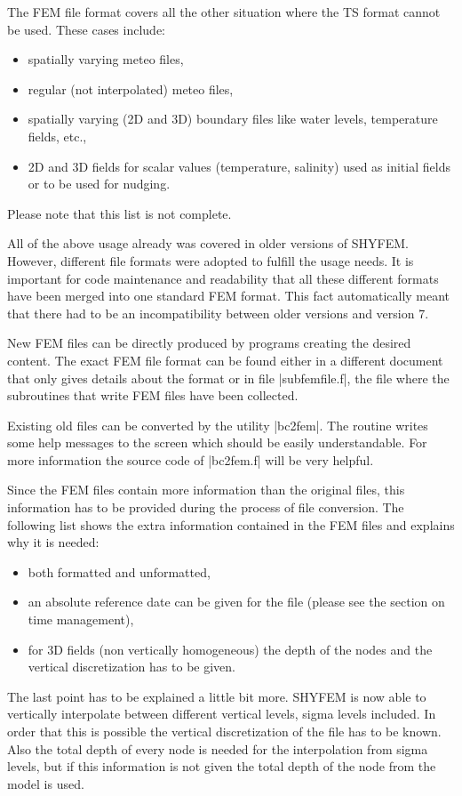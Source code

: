 \documentclass[12pt,draft]{article}
\newcommand{\shyfem}{SHYFEM}
\begin{document}
The FEM file format covers all the other situation where the 
TS format cannot be used. These cases include:
\begin{itemize}
\item spatially varying meteo files,
\item regular (not interpolated) meteo files,
\item spatially varying (2D and 3D) boundary files like
water levels, temperature fields, etc.,
\item 2D and 3D fields for scalar values (temperature, 
salinity) used as initial fields or to be used for nudging.
\end{itemize}
Please note that this list is not complete. 

All of the above usage already was covered in older versions
of \shyfem{}. However, different file formats were adopted 
to fulfill the usage needs. It is important for code
maintenance and readability that all these different formats have been merged into one standard FEM format. This fact 
automatically meant that there had to be an incompatibility
between older versions and version 7.

New FEM files can be directly produced by programs creating the
desired content. The exact FEM file format can be found either
in a different document that only gives details about the format
or in file |subfemfile.f|, the file where the subroutines that write
FEM files have been collected.

Existing old files can be converted by the utility |bc2fem|. The
routine writes some help messages to the screen which should
be easily understandable. For more information the source code
of |bc2fem.f| will be very helpful.

Since the FEM files contain more information than the original 
files, this information has to be provided during the process
of file conversion. The following list shows the extra information contained in the FEM files and explains why it is needed:
\begin{itemize}
\item both formatted and unformatted,
\item an absolute reference date can be given for the file (please see the section on time management),
\item for 3D fields (non vertically homogeneous) the depth
of the nodes and the vertical discretization has to be given.
\end{itemize}

The last point has to be explained a little bit more. \shyfem{}
is now able to vertically interpolate between different vertical
levels, sigma levels included. In order that this is possible the
vertical discretization of the file has to be known. Also the
total depth of every node is needed for the interpolation from
sigma levels, but if this information is not given the total depth
of the node from the model is used.
\end{document}
